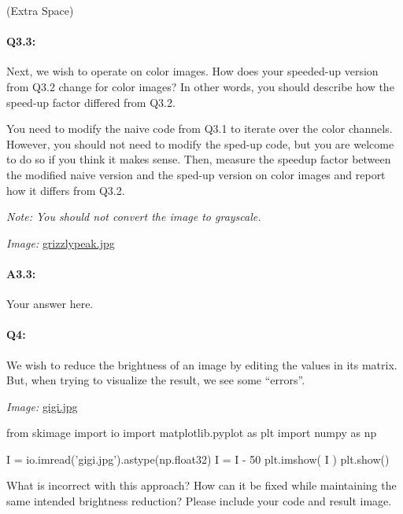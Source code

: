 \documentclass[11pt]{article}
\begin{document}
 (Extra Space)


\pagebreak
\paragraph{Q3.3:} Next, we wish to operate on color images. How does your speeded-up version from Q3.2 change for color images? In other words, you should describe how the speed-up factor differed from Q3.2.

You need to modify the naive code from Q3.1 to iterate over the color channels. However, you should not need to modify the sped-up code, but you are welcome to do so if you think it makes sense. Then, measure the speedup factor between the modified naive version and the sped-up version on color images and report how it differs from Q3.2.

\emph{Note: You should not convert the image to grayscale.}

\emph{Image:} \href{grizzlypeak.jpg}{grizzlypeak.jpg}

\paragraph{A3.3:} Your answer here.




\pagebreak
\paragraph{Q4:} We wish to reduce the brightness of an image by editing the values in its matrix. But, when trying to visualize the result, we see some ``errors''.

\emph{Image:} \href{gigi.jpg}{gigi.jpg}

\begin{python}
from skimage import io
import matplotlib.pyplot as plt
import numpy as np

I =  io.imread('gigi.jpg').astype(np.float32)
I = I - 50
plt.imshow( I )
plt.show()
\end{python}

What is incorrect with this approach? How can it be fixed while maintaining the same intended brightness reduction? Please include your code and result image.
\end{document}
